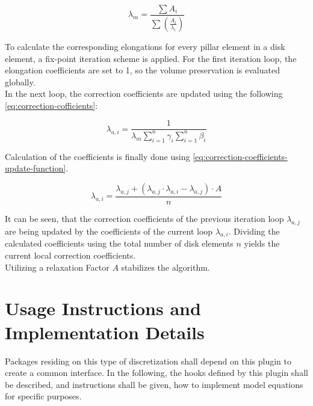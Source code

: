 \documentclass[11pt]{PyRollDocs}
\begin{document}
    \begin{equation}
        \lambda_{m} = \frac{\sum A_{i}}{\sum \left( \frac{A_{i}}{\lambda_i} \right)}
        \label{eq:elongation-correction}
    \end{equation}

    To calculate the corresponding elongations for every pillar element in a disk element, a fix-point iteration scheme is applied.
    For the first iteration loop, the elongation coefficients are set to 1, so the volume preservation is evaluated globally.\\
    In the next loop, the correction coefficients are updated using the following \autoref{eq:correction-cofficients}:

    \begin{equation}
        \lambda_{a, i} = \frac{1}{\lambda_{m} \sum_{i=1}^{n} \gamma_{i} \sum_{i=1}^{n} \beta_{i} }
        \label{eq:correction-cofficients}
    \end{equation}

    Calculation of the coefficients is finally done using \autoref{eq:correction-coefficients-update-function}.

    \begin{equation}
        \lambda_{a, i} = \frac{\lambda_{a, j} +  \left( \lambda_{a, j} \cdot \lambda_{a, i} - \lambda_{a, j} \right) \cdot A}{n}
        \label{eq:correction-coefficients-update-function}
    \end{equation}

    It can be seen, that the correction coefficients of the previous iteration loop $\lambda_{a, j}$ are being updated by the coefficients of the current loop $\lambda_{a, i}$.
    Dividing the calculated coefficients using the total number of disk elements $n$ yields the current local correction coefficients.\\
    Utilizing a relaxation Factor $A$ stabilizes the algorithm.


    \section{Usage Instructions and Implementation Details}\label{sec:usage-instructions}

    Packages residing on this type of discretization shall depend on this plugin to create a common interface.
    In the following, the hooks defined by this plugin shall be described, and instructions shall be given, how to implement model equations for specific purposes.
\end{document}
